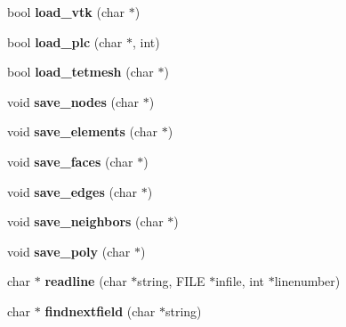 \begin{DoxyCompactItemize}
\item 
\hypertarget{classtetgenio_a566bcdee657ea1ca15a64bcb2acd4231}{bool {\bfseries load\-\_\-vtk} (char $\ast$)}\label{classtetgenio_a566bcdee657ea1ca15a64bcb2acd4231}

\item 
\hypertarget{classtetgenio_ac47582d8d9a09f1d8d32221527a0aa7b}{bool {\bfseries load\-\_\-plc} (char $\ast$, int)}\label{classtetgenio_ac47582d8d9a09f1d8d32221527a0aa7b}

\item 
\hypertarget{classtetgenio_a92a915a05039f4aa53ed5c042d311b95}{bool {\bfseries load\-\_\-tetmesh} (char $\ast$)}\label{classtetgenio_a92a915a05039f4aa53ed5c042d311b95}

\item 
\hypertarget{classtetgenio_a80500674e90ab22d30f1d56a9a15cd3c}{void {\bfseries save\-\_\-nodes} (char $\ast$)}\label{classtetgenio_a80500674e90ab22d30f1d56a9a15cd3c}

\item 
\hypertarget{classtetgenio_a9201c6478b6e805091b548d5a31c9236}{void {\bfseries save\-\_\-elements} (char $\ast$)}\label{classtetgenio_a9201c6478b6e805091b548d5a31c9236}

\item 
\hypertarget{classtetgenio_a3a3cf78a000db81c949ebea34609a8a0}{void {\bfseries save\-\_\-faces} (char $\ast$)}\label{classtetgenio_a3a3cf78a000db81c949ebea34609a8a0}

\item 
\hypertarget{classtetgenio_aee72faff0abaf56e1b59596c29188828}{void {\bfseries save\-\_\-edges} (char $\ast$)}\label{classtetgenio_aee72faff0abaf56e1b59596c29188828}

\item 
\hypertarget{classtetgenio_a1b3b4554c3ddfe5c93860aa5630eb762}{void {\bfseries save\-\_\-neighbors} (char $\ast$)}\label{classtetgenio_a1b3b4554c3ddfe5c93860aa5630eb762}

\item 
\hypertarget{classtetgenio_ac512604429e7c754f3128a94133babdd}{void {\bfseries save\-\_\-poly} (char $\ast$)}\label{classtetgenio_ac512604429e7c754f3128a94133babdd}

\item 
\hypertarget{classtetgenio_a085af1b2c889a6545f6aab67aad1ba43}{char $\ast$ {\bfseries readline} (char $\ast$string, F\-I\-L\-E $\ast$infile, int $\ast$linenumber)}\label{classtetgenio_a085af1b2c889a6545f6aab67aad1ba43}

\item 
\hypertarget{classtetgenio_ad181a411db5dbcb1e11af7641e268bd5}{char $\ast$ {\bfseries findnextfield} (char $\ast$string)}\label{classtetgenio_ad181a411db5dbcb1e11af7641e268bd5}


\end{DoxyCompactItemize}
